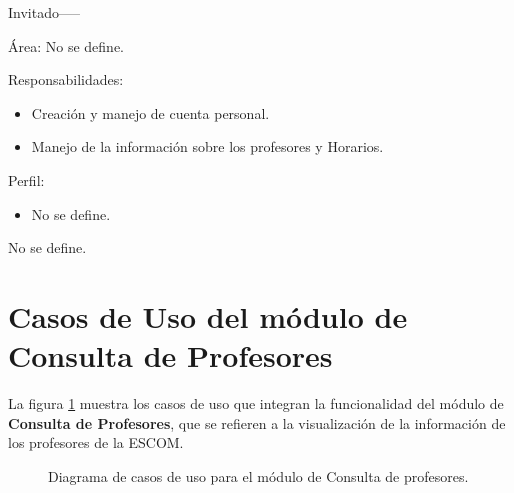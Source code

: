 \begin{actor}{Invitado}{-----}
	
	\item[Área:] No se define.
	
	\item[Responsabilidades:] \hspace{1pt}
	
	\begin{itemize}
		\item Creación y manejo de cuenta personal.
		\item Manejo de la información sobre los profesores y Horarios.
	\end{itemize}
	\item[Perfil:] \hspace{1pt}
	\begin{itemize}
		\item No se define.
	\end{itemize}
		\item No se define.
\end{actor}




\section{Casos de Uso del módulo de Consulta de Profesores}

La figura \ref{fig:casosUso:generacionCalendario} muestra los casos de uso que integran la funcionalidad del módulo de \textbf{Consulta de Profesores}, que se refieren a la visualización de la información de los profesores de la ESCOM.

\begin{figure}[h!]
	\begin{center}
		\caption{Diagrama de casos de uso para el módulo de Consulta de profesores. \label{fig:casosUso:generacionCalendario}}
	\end{center}
\end{figure}

